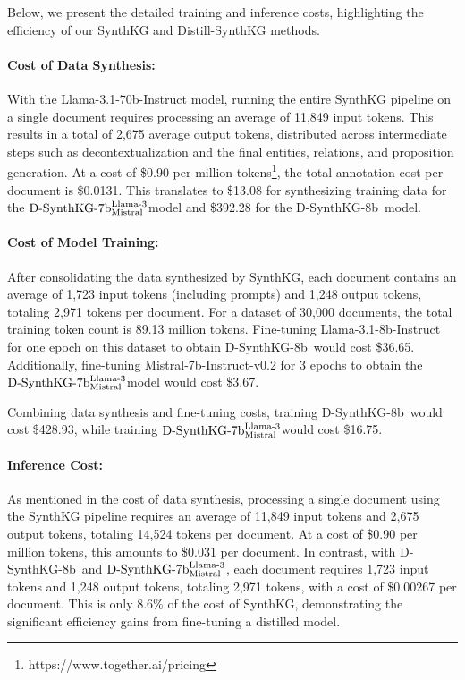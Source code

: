 \documentclass{article} %
\newcommand{\distilledLlama}{\textrm{D-SynthKG-8b}}
\newcommand{\distilledMistralLlama}{$\textrm{D-SynthKG-7b}_{\text{\scriptsize Mistral }}^{\text{\scriptsize Llama-3}}$}
\begin{document}
Below, we present the detailed training and inference costs, highlighting the efficiency of our SynthKG and Distill-SynthKG methods.

\paragraph{Cost of Data Synthesis:} With the Llama-3.1-70b-Instruct model, running the entire SynthKG pipeline on a single document requires processing an average of 11,849 input tokens. This results in a total of 2,675 average output tokens, distributed across intermediate steps such as decontextualization and the final entities, relations, and proposition generation. At a cost of \$0.90 per million tokens\footnote{https://www.together.ai/pricing}, the total annotation cost per document is \$0.0131. This translates to \$13.08 for synthesizing training data for the \distilledMistralLlama model and \$392.28 for the \distilledLlama \ model.

\paragraph{Cost of Model Training:} After consolidating the data synthesized by SynthKG, each document contains an average of 1,723 input tokens (including prompts) and 1,248 output tokens, totaling 2,971 tokens per document. For a dataset of 30,000 documents, the total training token count is 89.13 million tokens. Fine-tuning Llama-3.1-8b-Instruct for one epoch on this dataset to obtain \distilledLlama\ would cost \$36.65. Additionally, fine-tuning Mistral-7b-Instruct-v0.2 for 3 epochs to obtain the \distilledMistralLlama model would cost \$3.67.

Combining data synthesis and fine-tuning costs, training \distilledLlama\ would cost \$428.93, while training \distilledMistralLlama would cost \$16.75. 

\paragraph{Inference Cost:} As mentioned in the cost of data synthesis, processing a single document using the SynthKG pipeline requires an average of 11,849 input tokens and 2,675 output tokens, totaling 14,524 tokens per document. At a cost of \$0.90 per million tokens, this amounts to \$0.031 per document. In contrast, with \distilledLlama\ and \distilledMistralLlama, each document requires 1,723 input tokens and 1,248 output tokens, totaling 2,971 tokens, with a cost of \$0.00267 per document. This is only 8.6\% of the cost of SynthKG, demonstrating the significant efficiency gains from fine-tuning a distilled model.
\end{document}
